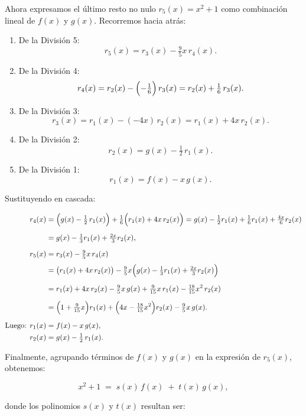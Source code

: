 \documentclass[12pt]{article}
\begin{document}
Ahora expresamos el último resto no nulo
\(r_5(x) = x^2 + 1\) como combinación lineal de
\(f(x)\) y \(g(x)\). Recorremos hacia atrás:

\begin{enumerate}
  \item De la División 5: 
  \[
    r_5(x) = r_3(x) - \tfrac{9}{5}x\,r_4(x).
  \]
  \item De la División 4:
  \[
    r_4(x) = r_2(x) - \Bigl(-\tfrac{1}{6}\Bigr)\,r_3(x)
            = r_2(x) + \tfrac{1}{6}\,r_3(x).
  \]
  \item De la División 3:
  \[
    r_3(x) = r_1(x) - (-4x)\,r_2(x)
            = r_1(x) + 4x\,r_2(x).
  \]
  \item De la División 2:
  \[
    r_2(x) = g(x) - \tfrac12\,r_1(x).
  \]
  \item De la División 1:
  \[
    r_1(x) = f(x) - x\,g(x).
  \]
\end{enumerate}

Sustituyendo en cascada:

\begin{align*}
  r_4(x) &= \Bigl(g(x) - \tfrac12\,r_1(x)\Bigr) + \tfrac{1}{6}\Bigl(r_1(x) + 4x\,r_2(x)\Bigr)
           = g(x) - \tfrac{1}{2}r_1(x) + \tfrac{1}{6}r_1(x) + \tfrac{4x}{6}r_2(x) \\[6pt]
          &= g(x) - \tfrac{1}{3}r_1(x) + \tfrac{2x}{3}r_2(x), \\[6pt]
  r_5(x) &= r_3(x) - \tfrac{9}{5}x\,r_4(x) \\[3pt]
          &= \bigl(r_1(x) + 4x\,r_2(x)\bigr)
             - \tfrac{9}{5}x\Bigl(g(x) - \tfrac{1}{3}r_1(x) + \tfrac{2x}{3}r_2(x)\Bigr) \\[6pt]
          &= r_1(x) + 4x\,r_2(x)
             - \tfrac{9}{5}x\,g(x)
             + \tfrac{9}{15}x\,r_1(x)
             - \tfrac{18}{15}x^2\,r_2(x) \\[6pt]
          &= \Bigl(1 + \tfrac{9}{15}x\Bigr)r_1(x)
             + \Bigl(4x - \tfrac{18}{15}x^2\Bigr)r_2(x)
             - \tfrac{9}{5}x\,g(x). \\[6pt]
  \text{Luego: }r_1(x) &= f(x) - x\,g(x), \\
                   r_2(x) &= g(x) - \tfrac12\,r_1(x).
\end{align*}

Finalmente, agrupando términos de \(f(x)\) y \(g(x)\) en la expresión de \(r_5(x)\),
obtenemos:

\[
  x^2 + 1 \;=\; s(x)\,f(x) \;+\; t(x)\,g(x),
\]

donde los polinomios \(s(x)\) y \(t(x)\) resultan ser:
\end{document}
